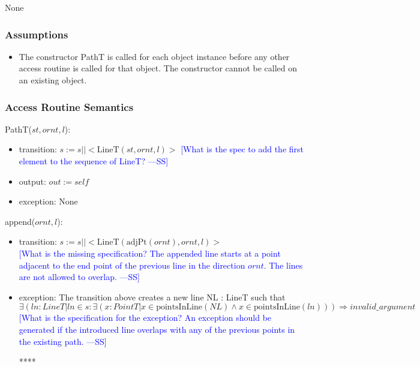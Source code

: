 \documentclass[12pt]{article}
\newcommand{\authornote}[3]{\textcolor{#1}{[#3 ---#2]}}
\newcommand{\authornote}[3]{}
\newcommand{\wss}[1]{\authornote{blue}{SS}{#1}}
\begin{document}
None

\subsubsection* {Assumptions}

\begin{itemize}
\item The constructor PathT is called for each object instance before any other
access routine is called for that object.  The constructor cannot be called on
an existing object.
\end{itemize}

\subsubsection* {Access Routine Semantics}

PathT($st, ornt, l$):
\begin{itemize}
\item transition: $s :=  s || < \mbox{LineT}(st,ornt,l) >$ \wss{What is the spec to add the first element to the sequence
  of LineT?}
\item output: $out := \mathit{self}$
\item exception: None
\end{itemize}

\noindent append($ornt, l$):
\begin{itemize}
\item transition: $ s :=  s || < \mbox{LineT}(\mbox{adjPt}(ornt),ornt,l) >$\\
    \wss{What is the missing specification?  The appended line
    starts at a point adjacent to the end point of the previous line in the
    direction $ornt$.  The lines are not allowed to
    overlap.}
\item exception: The transition above creates a new line NL : LineT such that\\
  $\exists(ln : LineT | ln \in s : \exists(x : PointT | x \in \mbox{pointsInLine}(NL) \land x \in \mbox{pointsInLine}(ln))) \Rightarrow  invalid\_argument$
 \\\wss{What is the specification for the exception?  An exception
    should be generated if the introduced line overlaps with any of the previous
    points in the existing path.}

    ****
\end{itemize}
\end{document}
